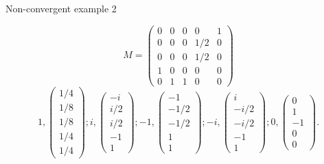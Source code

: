 \documentclass[10pt]{beamer}
\begin{document}
\begin{frame}[allowframebreaks]{Non-convergent example 2}
  \begin{center}
  \end{center}
  \[
    M =
    \begin{pmatrix}
      0 & 0 & 0 &   0 & 1\\
      0 & 0 & 0 & 1/2 & 0\\
      0 & 0 & 0 & 1/2 & 0\\
      1 & 0 & 0 & 0   & 0\\
      0 & 1 & 1 & 0   & 0
    \end{pmatrix}
  \]
  \[
    1,
    \begin{pmatrix}1/4\\1/8\\1/8\\1/4\\1/4
    \end{pmatrix};
    i,
    \begin{pmatrix}-i\\i/2\\i/2\\-1\\1
    \end{pmatrix};
    -1,
    \begin{pmatrix}-1\\-1/2\\-1/2\\1\\1
    \end{pmatrix};
    -i,
    \begin{pmatrix}i\\-i/2\\-i/2\\-1\\1
    \end{pmatrix};
    0,
    \begin{pmatrix}0\\1\\-1\\0\\0
    \end{pmatrix}.
  \]
  \framebreak


\end{frame}
\end{document}

